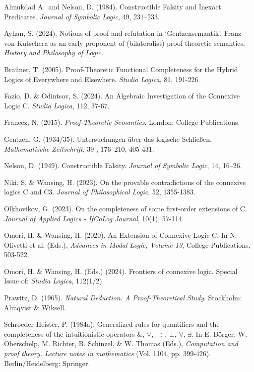 \documentclass{article}%
\theoremstyle{break}
\begin{document}
\begin{thebibliography}{}

 Almukdad A.~and Nelson, D. (1984).  Constructible Falsity and Inexact \mbox{Predicates}. {\em Journal of Symbolic Logic}, 49, 231--233.

 Ayhan, S. (2024). Notions of proof and refutation in ‘Gentzensemantik’. Franz von Kutschera as an early proponent of (bilateralist) proof-theoretic semantics. {\em History and Philosophy of Logic}.

 Braüner, T. (2005). Proof-Theoretic Functional Completeness for the Hybrid Logics of Everywhere and Elsewhere. {\em Studia Logica}, 81, 191-226.

 Fazio, D. \& Odintsov, S. (2024). An Algebraic Investigation of the Connexive Logic C. {\em Studia Logica}, 112, 37-67.

 Francez, N. (2015). \textit{Proof-Theoretic Semantics}. London: College Publications.


 Gentzen, G. (1934/35). Untersuchungen \"uber das logische Schlie\ss en. {\em Mathematische Zeitschrift}, 39 , 176–210, 405-431.

 Nelson, D. (1949). Constructible Falsity. {\em Journal of Symbolic Logic}, 14, 16--26.

 Niki, S. \& Wansing, H. (2023). On the provable contradictions of the connexive logics C and C3. {\em Journal of Philosophical Logic}, 52, 1355-1383.





 Olkhovikov, G. (2023). On the completeness of some first-order extensions of C. {\em Journal of Applied Logics - IfCoLog Journal}, 10(1), 57-114.

 Omori, H. \& Wansing, H. (2020). An Extension of Connexive Logic C, In N. Olivetti et al. (Eds.), {\em Advances in Modal Logic, Volume 13}, College Publications, 503-522.

 Omori, H. \& Wansing, H. (Eds.) (2024). Frontiers of connexive logic. Special Issue of: {\em Studia Logica}, 112(1/2).

 Prawitz, D. (1965). {\em Natural Deduction. A Proof-Theoretical Study}. Stockholm: Almqvist \& Wiksell.

 Schroeder-Heister, P. (1984a). Generalized rules for quantifiers and the completeness of the intuitionistic operators \&, $\vee$, $\supset$, $\bot$, $\forall$, $\exists$. In E. Börger, W. Oberschelp, M. Richter, B. Schinzel, \& W. Thomas (Eds.), {\em Computation and proof theory. Lecture notes in mathematics} (Vol. 1104, pp. 399-426). Berlin/Heidelberg: Springer.


\end{thebibliography}
\end{document}
